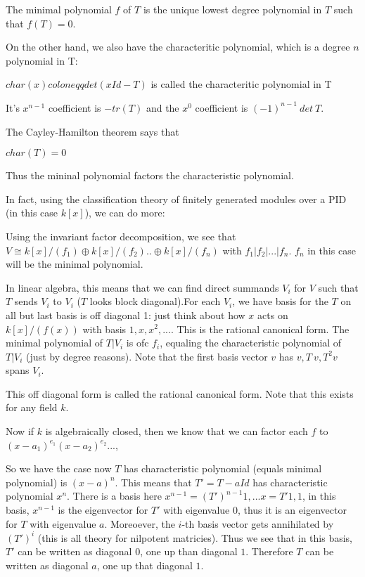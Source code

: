 \documentclass[main.tex]{subfiles}
\begin{document}
\begin{definition}
The minimal polynomial $f$ of $T$ is the unique lowest degree polynomial in $T$ such that $f(T) = 0$.
\end{definition}

On the other hand, we also have the characteritic polynomial, which is a degree $n$ polynomial in T:
\begin{definition}
$char(x) coloneqq det (xId - T)$ is called the characteritic polynomial in T
\end{definition}

It's $x^{n-1}$ coefficient is $-tr(T)$ and the $x^0$ coefficient is $(-1)^{n-1} \ det \ T$. 

The Cayley-Hamilton theorem says that 
\begin{theorem}
$char(T) = 0$
\end{theorem}
Thus the mininal polynomial factors the characteristic polynomial.

In fact, using the classification theory of finitely generated modules over a PID (in this case $k[x]$), we can do more:

Using the invariant factor decomposition, we see that $V \cong k[x]/(f_1) \oplus k[x]/(f_2) .. \oplus k[x]/(f_n)$ with $f_1 | f_2 | ... | f_n$. $f_n$ in this case will be the minimal polynomial. 

In linear algebra, this means that we can find direct summands $V_i$ for $V$ such that $T$ sends $V_i$ to $V_i$ ($T$ looks block diagonal).For each $V_i$, we have basis for the $T$ on all but last basis is off diagonal 1: just think about how $x$ acts on $k[x]/(f(x))$ with basis $1, x, x^2, ...$. This is the rational canonical form. The minimal polynomial of $T|V_i$ is ofc $f_i$, equaling the characteristic polynomial of $T|V_i$ (just by degree reasons). Note that the first basis vector $v$ has $v, T\ v, T^2 v $ spans $V_i$.

This off diagonal form is called the rational canonical form. Note that this exists for any field $k$. 

Now if $k$ is algebraically closed, then we know that we can factor each $f$ to $(x-a_1)^{e_1} (x - a_2)^{e_2}...$,

So we have the case now $T$ has characteristic polynomial (equals minimal polynomial) is $(x-a)^n$. This means that $T ' = T - a Id$ has characteristic polynomial $x^n$. There is a basis here $x^{n-1} = (T')^{n-1} 1,... x = T' 1, 1$, in this basis, $x^{n-1}$ is the eigenvector for $T'$ with eigenvalue $0$, thus it is an eigenvector for $T$ with eigenvalue $a$. Moreoever, the $i$-th basis vector gets annihilated by $(T')^i$ (this is all theory for nilpotent matricies). Thus we see that in this basis, $T'$ can be written as diagonal $0$, one up than diagonal $1$. Therefore $T$ can be written as diagonal $a$, one up that diagonal $1$. 
\end{document}
